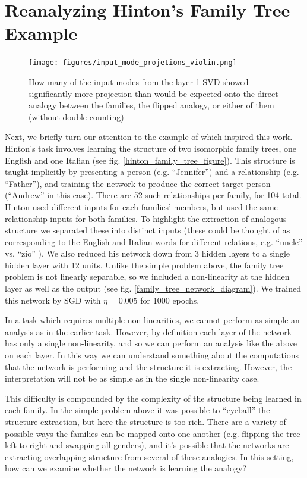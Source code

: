 \documentclass[10pt,letterpaper]{article}
\begin{document}
\section{Reanalyzing Hinton's Family Tree Example}
\begin{figure}[p]
\centering
\texttt{[image: figures/input\_mode\_projetions\_violin.png]}
\caption{How many of the input modes from the layer 1 SVD showed significantly more projection than would be expected onto the direct analogy between the families, the flipped analogy, or either of them (without double counting)}
\label{ft_input_mode_sig_hist}
\end{figure}
Next, we briefly turn our attention to the example of \citet{Hinton1986} which inspired this work. Hinton's task involves learning the structure of two isomorphic family trees, one English and one Italian (see fig. \ref{hinton_family_tree_figure}). This structure is taught implicitly by presenting a person (e.g. ``Jennifer'') and a relationship (e.g. ``Father''), and training the network to produce the correct target person (``Andrew'' in this case). There are 52 such relationships per family, for 104 total. Hinton used different inputs for each families' members, but used the same relationship inputs for both families. To highlight the extraction of analogous structure we separated these into distinct inputs (these could be thought of as corresponding to the English and Italian words for different relations, e.g. ``uncle'' vs. ``zio'' ). We also reduced his network down from 3 hidden layers to a single hidden layer with 12 units. Unlike the simple problem above, the family tree problem is not linearly separable, so we included a non-linearity at the hidden layer as well as the output (see fig. \ref{family_tree_network_diagram}). We trained this network by SGD with \(\eta = 0.005\) for 1000 epochs. \par 
In a task which requires multiple non-linearities, we cannot perform as simple an analysis as in the earlier task. However, by definition each layer of the network has only a single non-linearity, and so we can perform an analysis like the above on each layer. In this way we can understand something about the computations that the network is performing and the structure it is extracting. However, the interpretation will not be as simple as in the single non-linearity case. \par
This difficulty is compounded by the complexity of the structure being learned in each family. In the simple problem above it was possible to ``eyeball'' the structure extraction, but here the structure is too rich. There are a variety of possible ways the families can be mapped onto one another (e.g. flipping the tree left to right and swapping all genders), and it's possible that the networks are extracting overlapping structure from several of these analogies. In this setting, how can we examine whether the network is learning the analogy? \par
\end{document}
